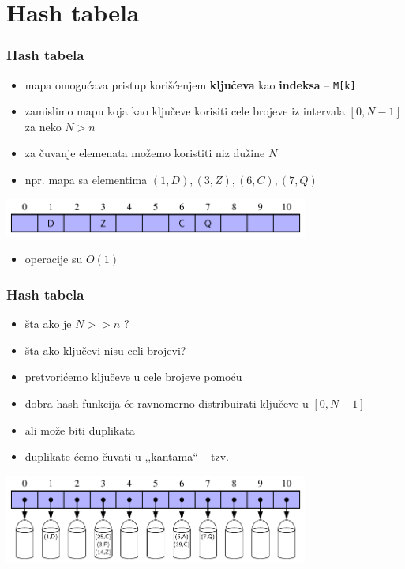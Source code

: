 \documentclass[compress]{beamer}
\begin{document}
\section[Hash tabela]{Hash tabela}
\begin{frame}[fragile]
  \frametitle{Hash tabela}
  \begin{itemize}
    \item mapa omogućava pristup korišćenjem \textbf{ključeva} kao \textbf{indeksa} -- \texttt{M[k]}  
    \item zamislimo mapu koja kao ključeve korisiti cele brojeve iz intervala $[0, N-1]$ za neko $N > n$
    \item za čuvanje elemenata možemo koristiti  niz dužine $N$
    \item npr. mapa sa elementima $(1,D), (3,Z), (6,C), (7,Q)$
  \end{itemize}
  \begin{center}
    \includegraphics[width=10cm]{asp-10-pic04.pdf}
  \end{center}
  \begin{itemize}
    \item operacije su $O(1)$  
  \end{itemize}
\end{frame}

\begin{frame}[fragile]
  \frametitle{Hash tabela}
  \begin{itemize}
    \item šta ako je $N >> n$ ?  
    \item šta ako ključevi nisu celi brojevi?
    \item pretvorićemo ključeve u cele brojeve pomoću 
    \item dobra hash funkcija će ravnomerno distribuirati ključeve u $[0,N-1]$
    \item ali može biti duplikata
    \item duplikate ćemo čuvati u ,,kantama`` -- tzv. 
  \end{itemize}
  \begin{center}
    \includegraphics[width=10cm]{asp-10-pic05.pdf}
  \end{center}
\end{frame}
\end{document}
